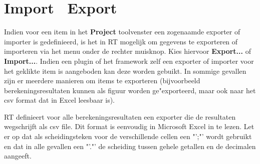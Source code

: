 \section {Import \ Export}
Indien voor een item in het \textbf{Project} toolvenster een zogenaamde exporter of importer is gedefinieerd, is het in RT mogelijk om gegevens te exporteren of importeren via het menu onder de rechter muisknop. Kies hiervoor \textbf{Export...} of \textbf{Import...}. Indien een plugin of het framework zelf een exporter of importer voor het geklikte item is aangeboden kan deze worden gebuikt. In sommige gevallen zijn er meerdere manieren om items te exporteren (bijvoorbeeld berekeningsresultaten kunnen als figuur worden ge"exporteerd, maar ook naar het csv format dat in Excel leesbaar is).

RT definieert voor alle berekeningsresultaten een exporter die de resultaten wegschrijft als csv file. Dit format is eenvoudig in Microsoft Excel in te lezen. Let er op dat als scheidingsteken voor de verschillende cellen een "';"' wordt gebruikt en dat in alle gevallen een "'."'  de scheiding tussen gehele getallen en de decimalen aangeeft.